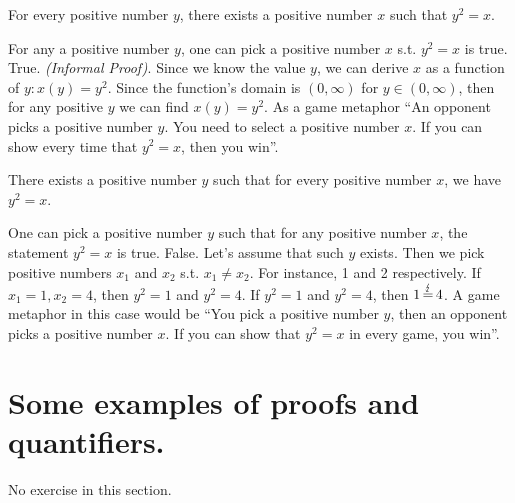 \begin{subexercises}
    \begin{exercise}
        For every positive number $y$, there exists a positive number $x$ such that $y^2 = x$.
    \end{exercise}
    \begin{solution}
        For any a positive number $y$, one can pick a positive number $x$ s.t. $y^2=x$ is true. True. \emph{(Informal Proof)}.  Since we know the value $y$, we can derive $x$ as a function of $y: x(y)=y^2$. Since the function's domain is $(0, \infty)$ for $y \in (0, \infty)$, then for any positive $y$ we can find $x(y)=y^2$. As a game metaphor ``An opponent picks a positive number $y$. You need to select a positive number $x$. If you can show every time that $y^2=x$, then you win''.
    \end{solution}

    \begin{exercise}
        There exists a positive number $y$ such that for every positive number $x$, we have $y^2 = x$.
    \end{exercise}

    \begin{solution}
        One can pick a positive number $y$ such that for any positive number $x$, the statement $y^2=x$ is true. False. Let's assume that such $y$ exists. Then we pick positive numbers $x_1$ and $x_2$ s.t. $x_1\neq x_2$. For instance, 1 and 2 respectively. If $x_1=1, x_2=4$, then $y^2=1$ and $y^2=4$. If $y^2=1$ and $y^2=4$, then $1\operatorname{\stackrel{\lightning}{=}} 4$. A game metaphor in this case would be ``You pick a positive number $y$, then an opponent picks a positive number $x$. If you can show that $y^2=x$ in every game, you win''.
    \end{solution}
\end{subexercises}

\section{Some examples of proofs and quantifiers.}
No exercise in this section.

